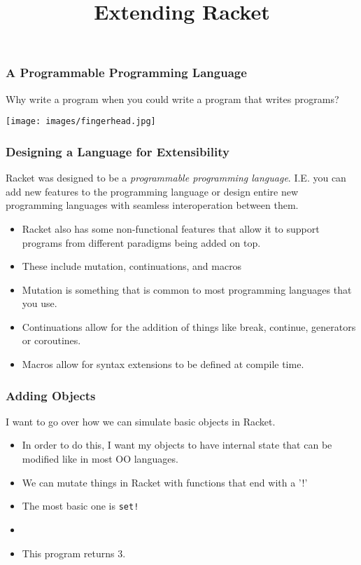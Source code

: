 \documentclass{beamer}
\title{Extending Racket}
\begin{document}
\begin{frame}
\titlepage
\end{frame}

\begin{frame}
  \frametitle{A Programmable Programming Language}
  \huge Why write a program when you could write a program that writes
  programs?\\
  \begin{center}
    \texttt{[image: images/fingerhead.jpg]}
  \end{center}
\end{frame}

\begin{frame}
  \frametitle{Designing a Language for Extensibility}
  Racket was designed to be a \emph{programmable programming language}.
  I.E. you can add new features to the programming language or design
  entire new programming languages with seamless interoperation 
  between them.
  \begin{itemize}
  \item<2-> Racket also has some non-functional features that allow
    it to support programs from different paradigms being added on top.
  \item<3-> These include mutation, continuations, and macros
  \item<4-> Mutation is something that is common to most programming languages
    that you use.
  \item<5-> Continuations allow for the addition of things like break, continue,
    generators or coroutines.
  \item<6-> Macros allow for syntax extensions to be defined at compile time.
  \end{itemize}
\end{frame}



\begin{frame}
  \frametitle{Adding Objects}
  I want to go over how we can simulate basic objects
  in Racket.
  \begin{itemize}
  \item<2-> In order to do this, I want my objects to have internal state
    that can be modified like in most OO languages.
  \item<3-> We can mutate things in Racket with functions that end with a '!'
  \item<4-> The most basic one is \texttt{set!}
  \item<5-> \mutate
  \item<6-> This program returns 3.
  \end{itemize}
\end{frame}
\end{document}
